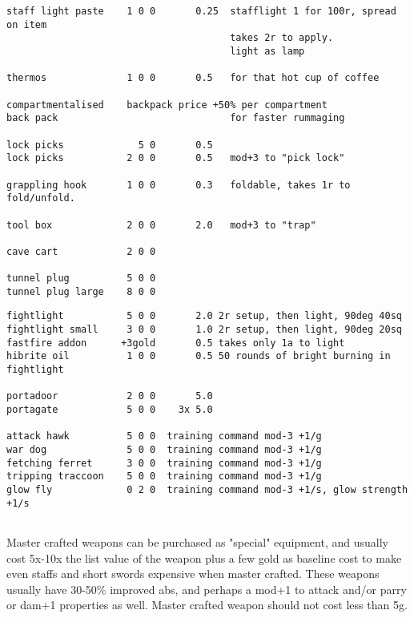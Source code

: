 \begin{verbatim}
\end{verbatim} \pagebreak[1] \begin{verbatim}
staff light paste    1 0 0       0.25  stafflight 1 for 100r, spread on item
                                       takes 2r to apply.
                                       light as lamp

thermos              1 0 0       0.5   for that hot cup of coffee

compartmentalised    backpack price +50% per compartment
back pack                              for faster rummaging

lock picks             5 0       0.5
lock picks           2 0 0       0.5   mod+3 to "pick lock"

grappling hook       1 0 0       0.3   foldable, takes 1r to fold/unfold.

tool box             2 0 0       2.0   mod+3 to "trap"

cave cart            2 0 0

tunnel plug          5 0 0
tunnel plug large    8 0 0

\end{verbatim} \pagebreak[1] \begin{verbatim}
fightlight           5 0 0       2.0 2r setup, then light, 90deg 40sq
fightlight small     3 0 0       1.0 2r setup, then light, 90deg 20sq
fastfire addon      +3gold       0.5 takes only 1a to light
hibrite oil          1 0 0       0.5 50 rounds of bright burning in fightlight

portadoor            2 0 0       5.0
portagate            5 0 0    3x 5.0

attack hawk          5 0 0  training command mod-3 +1/g
war dog              5 0 0  training command mod-3 +1/g
fetching ferret      3 0 0  training command mod-3 +1/g
tripping traccoon    5 0 0  training command mod-3 +1/g
glow fly             0 2 0  training command mod-3 +1/s, glow strength +1/s


\end{verbatim}
\normalsize

Master crafted weapons can be purchased as "special" equipment, and usually cost 5x-10x the list value of the weapon plus a few gold as baseline cost to make even staffs and short swords expensive when master crafted. These weapons usually have 30-50\% improved abs, and perhaps a mod+1 to attack and/or parry or dam+1 properties as well. Master crafted weapon should not cost less than 5g.

